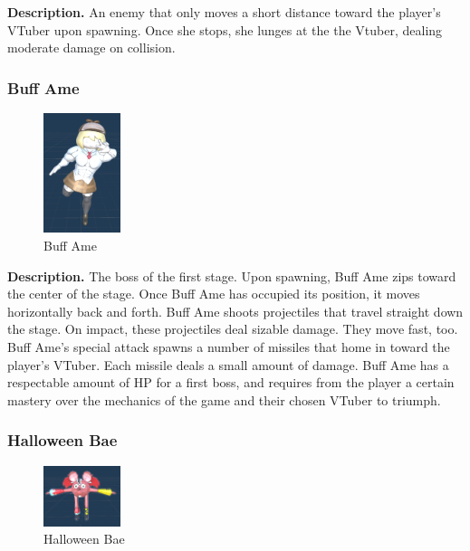 \documentclass[10pt, a4paper]{article}
\begin{document}
\begin{multicols}{2}
	\textbf{Description.} An enemy that only moves a short distance toward the player's VTuber upon spawning. Once she stops, she lunges at the the Vtuber, dealing moderate damage on collision.
	
	\subsubsection{Buff Ame}

	\begin{figure}[H]
		\centering
		\includegraphics[width=0.2\textwidth]{images/buff_ame1.png}
		\caption{Buff Ame}
		\label{fig:buffame}
	\end{figure}

	\textbf{Description.} The boss of the first stage. Upon spawning, Buff Ame zips toward the center of the stage. Once Buff Ame has occupied its position, it moves horizontally back and forth. Buff Ame shoots projectiles that travel straight down the stage. On impact, these projectiles deal sizable damage. They move fast, too. Buff Ame's special attack spawns a number of missiles that home in toward the player's VTuber. Each missile deals a small amount of damage. Buff Ame has a respectable amount of HP for a first boss, and requires from the player a certain mastery over the mechanics of the game and their chosen VTuber to triumph.

	\subsubsection{Halloween Bae}

	\begin{figure}[H]
		\centering
		\includegraphics[width=0.2\textwidth]{images/halloween_bae1.png}
		\caption{Halloween Bae}
		\label{fig:halloweenbae}
	\end{figure}


\end{multicols}
\end{document}
